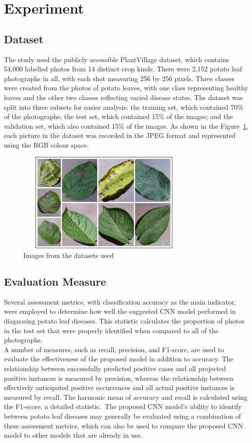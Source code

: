 \documentclass[conference]{IEEEtran}
\begin{document}
\section{Experiment}
\subsection{Dataset}
The study used the publicly accessible PlantVillage dataset, which contains 54,000 labelled photos from 14 distinct crop kinds. There were 2,152 potato leaf photographs in all, with each shot measuring 256 by 256 pixels. Three classes were created from the photos of potato leaves, with one class representing healthy leaves and the other two classes reflecting varied disease states. The dataset was split into three subsets for easier analysis: the training set, which contained 70\% of the photographs; the test set, which contained 15\% of the images; and the validation set, which also contained 15\% of the images. As shown in the Figure~\ref{fig: Figure 2}, each picture in the dataset was recorded in the JPEG format and represented using the RGB colour space.

 \begin{figure}[H]
 \includegraphics[width=8.8cm, height=5cm]{Potato Dataset.jpg}
\caption{Images from the datasets used}
\label{fig: Figure 2}
\end{figure}
 
\subsection{Evaluation Measure}
Several assessment metrics, with classification accuracy as the main indicator, were employed to determine how well the suggested CNN model performed in diagnosing potato leaf diseases. This statistic calculates the proportion of photos in the test set that were properly identified when compared to all of the photographs.\\ 


A number of measures, such as recall, precision, and F1-score, are used to evaluate the effectiveness of the proposed model in addition to accuracy. The relationship between successfully predicted positive cases and all projected positive instances is measured by precision, whereas the relationship between effectively anticipated positive occurrences and all actual positive instances is measured by recall. The harmonic mean of accuracy and recall is calculated using the F1-score, a detailed statistic.\
The proposed CNN model's ability to identify between potato leaf diseases may generally be evaluated using a combination of these assessment metrics, which can also be used to compare the proposed CNN model to other models that are already in use.
\end{document}
